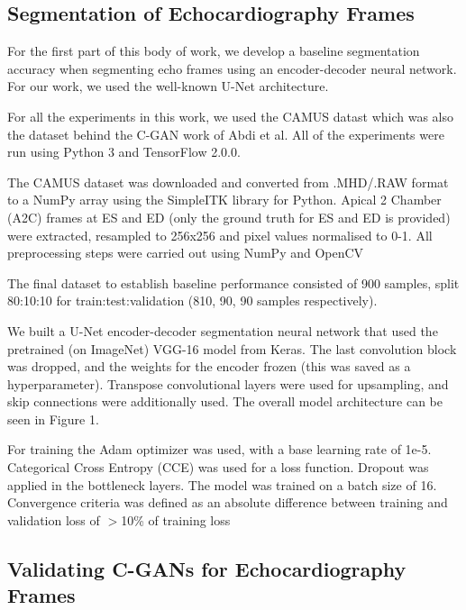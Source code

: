 \subsection{Segmentation of Echocardiography Frames}

For the first part of this body of work, we develop a baseline segmentation
accuracy when segmenting echo frames using an encoder-decoder neural network.
For our work, we used the well-known U-Net architecture. \newline

For all the experiments in this work, we used the CAMUS datast
\cite{leclercDeepLearningSegmentation2019} which was also the dataset behind the
C-GAN work of Abdi et al. All of the experiments were run using Python 3 and
TensorFlow 2.0.0.\newline

The CAMUS dataset was downloaded and converted from .MHD/.RAW format to a NumPy
array using the SimpleITK library for Python. Apical 2 Chamber (A2C) frames at
ES and ED (only the ground truth for ES and ED is provided) were extracted,
resampled to 256x256 and pixel values normalised to 0-1. All preprocessing steps
were carried out using NumPy and OpenCV \newline

The final dataset to establish baseline performance consisted of 900 samples,
split 80:10:10 for train:test:validation (810, 90, 90 samples respectively). \newline

We built a U-Net encoder-decoder segmentation neural network that used the
pretrained (on ImageNet) VGG-16 model from Keras. The last convolution block was
dropped, and the weights for the encoder frozen (this was saved as a
hyperparameter). Transpose convolutional layers were used for upsampling, and
skip connections were additionally used. The overall model architecture can be
seen in Figure 1. \newline

For training the Adam optimizer was used, with a base learning rate of 1e-5.
Categorical Cross Entropy (CCE) was used for a loss function. Dropout was
applied in the bottleneck layers. The model was trained on a batch size of 16.
Convergence criteria was defined as an absolute difference between training and
validation loss of $>$10\% of training loss \newline



\subsection{Validating C-GANs for Echocardiography Frames}

